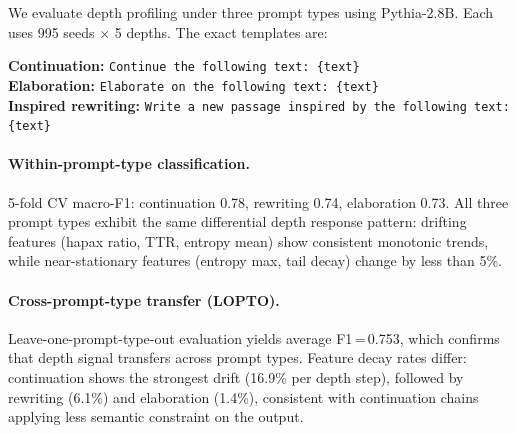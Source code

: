 We evaluate depth profiling under three prompt types using Pythia-2.8B. Each uses 995 seeds $\times$ 5 depths. The exact templates are:

\begin{tcolorbox}[colback=yellow!5!white, colframe=gray!50, title=Prompt Templates, breakable, fonttitle=\bfseries\small]
\textbf{Continuation:} \texttt{Continue the following text: \{text\}}\\[4pt]
\textbf{Elaboration:} \texttt{Elaborate on the following text: \{text\}}\\[4pt]
\textbf{Inspired rewriting:} \texttt{Write a new passage inspired by the following text: \{text\}}
\end{tcolorbox}

\paragraph{Within-prompt-type classification.}
5-fold CV macro-F1: continuation 0.78, rewriting 0.74, elaboration 0.73. All three prompt types exhibit the same differential depth response pattern: drifting features (hapax ratio, TTR, entropy mean) show consistent monotonic trends, while near-stationary features (entropy max, tail decay) change by less than 5\%.

\paragraph{Cross-prompt-type transfer (LOPTO).}
Leave-one-prompt-type-out evaluation yields average F1\,=\,0.753, which confirms that depth signal transfers across prompt types. Feature decay rates differ: continuation shows the strongest drift (16.9\% per depth step), followed by rewriting (6.1\%) and elaboration (1.4\%), consistent with continuation chains applying less semantic constraint on the output.
